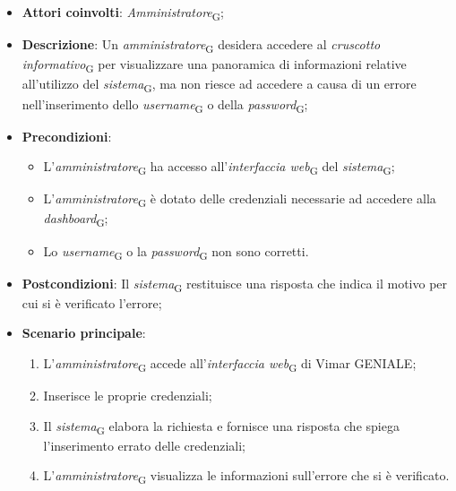 \begin{itemize}
    \item \textbf{Attori coinvolti}: \textit{Amministratore}\textsubscript{G};
    \item \textbf{Descrizione}: Un \textit{amministratore}\textsubscript{G} desidera accedere al \textit{cruscotto informativo}\textsubscript{G} per visualizzare una panoramica di informazioni relative all’utilizzo del \textit{sistema}\textsubscript{G}, ma non riesce ad accedere a causa di un errore nell’inserimento dello \textit{username}\textsubscript{G} o della \textit{password}\textsubscript{G};
    \item \textbf{Precondizioni}: 
    \begin{itemize}
        \item L’\textit{amministratore}\textsubscript{G} ha accesso all’\textit{interfaccia web}\textsubscript{G} del \textit{sistema}\textsubscript{G};
        \item L’\textit{amministratore}\textsubscript{G} è dotato delle credenziali necessarie ad accedere alla \textit{dashboard}\textsubscript{G};
        \item Lo \textit{username}\textsubscript{G} o la \textit{password}\textsubscript{G} non sono corretti.
    \end{itemize}
    \item \textbf{Postcondizioni}: Il \textit{sistema}\textsubscript{G} restituisce una risposta che indica il motivo per cui si è verificato l’errore;
    \item \textbf{Scenario principale}:
    \begin{enumerate}
        \item L’\textit{amministratore}\textsubscript{G} accede all’\textit{interfaccia web}\textsubscript{G} di Vimar GENIALE;
        \item Inserisce le proprie credenziali;
        \item Il \textit{sistema}\textsubscript{G} elabora la richiesta e fornisce una risposta che spiega l’inserimento errato delle credenziali;
        \item L’\textit{amministratore}\textsubscript{G} visualizza le informazioni sull’errore che si è verificato.
    \end{enumerate}
\end{itemize}



